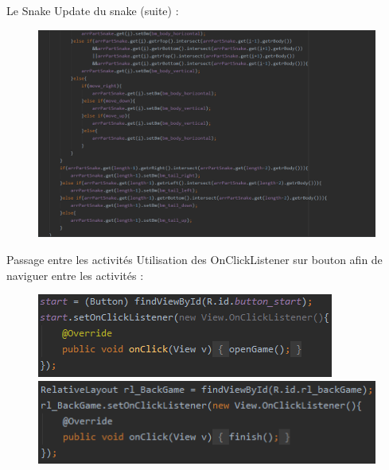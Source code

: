 \documentclass{beamer}
\begin{document}
\begin{frame}{Le Snake}
Update du snake (suite) :
    \begin{figure}
        \includegraphics[scale=0.4]{UpdateSnake3.png}
    \end{figure}
\end{frame}

%
%
\begin{frame}{Passage entre les activités}
    Utilisation des OnClickListener sur bouton afin de naviguer entre les activités :
    \begin{figure}
    \begin{minipage}[H]{0.5\linewidth}
        \centering
        \includegraphics[scale=0.5]{OnClickButtons.png}
    \end{minipage}
    \begin{minipage}[H]{0.5\linewidth}
        \centering
        \includegraphics[scale=0.5]{OnClickRelativeLayout.png}
    \end{minipage}
    \end{figure}
\end{frame}
\end{document}
